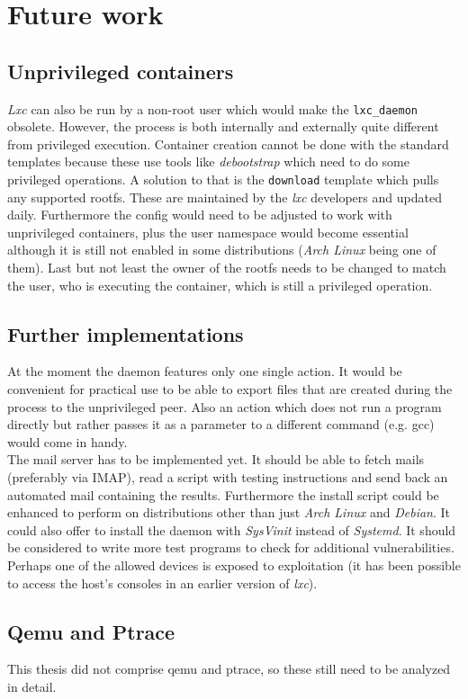 \chapter{Future work}

\section{Unprivileged containers}

\textit{Lxc} can also be run by a non-root user which would make the \texttt{lxc\_daemon} obsolete.
However, the process is both internally and externally quite different from privileged execution.
Container creation cannot be done with the standard templates because these use tools like
\textit{debootstrap} which need to do some privileged operations. A solution to that is the \texttt{download} template
which pulls any supported rootfs. These are maintained by the \textit{lxc} developers and updated daily.
Furthermore the config would need to
be adjusted to work with unprivileged containers, plus the user namespace would become essential
although it is still not enabled in some distributions (\textit{Arch Linux} being one of them).
Last but not least the owner of the rootfs needs to be changed to match the user, who is executing
the container, which is still a privileged operation.

\section{Further implementations}

At the moment the daemon features only one single action. It would be convenient for practical use
to be able to export files that are created during the process to the unprivileged peer.
Also an action which does not run a program directly but rather passes it as a parameter to a different
command (e.g. gcc) would come in handy.\\
The mail server has to be implemented yet. It should be able to fetch mails (preferably via IMAP),
read a script with testing instructions and send back an automated mail containing the results.
Furthermore the install script could be enhanced to perform on distributions other than just
\textit{Arch Linux} and \textit{Debian}. It could also offer to install the daemon with \textit{SysVinit}\cite{sysvinit}
instead of \textit{Systemd}\cite{systemd}.
It should be considered to write more test programs to check for additional vulnerabilities.
Perhaps one of the allowed devices is exposed to exploitation (it has been possible to access the
host's consoles in an earlier version of \textit{lxc}).

\section{Qemu and Ptrace}

This thesis did not comprise qemu and ptrace, so these still need to be analyzed in detail.